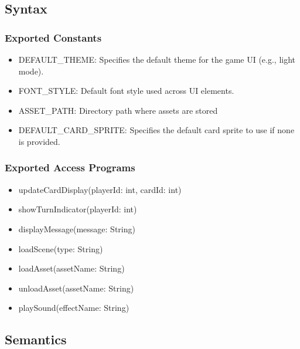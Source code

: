 \documentclass[12pt, titlepage]{article}
\begin{document}
\subsection{Syntax}

\subsubsection{Exported Constants}
\begin{itemize}
\item DEFAULT\_THEME: Specifies the default theme for the game UI (e.g., light mode).
\item FONT\_STYLE: Default font style used across UI elements.
\item ASSET\_PATH: Directory path where assets are stored
\item DEFAULT\_CARD\_SPRITE: Specifies the default card sprite to use if none is provided.

\end{itemize}

\subsubsection{Exported Access Programs}

\begin{itemize}
\item updateCardDisplay(playerId: int, cardId: int)
\item showTurnIndicator(playerId: int)
\item displayMessage(message: String)
\item loadScene(type: String)
\item loadAsset(assetName: String)
\item unloadAsset(assetName: String)
\item playSound(effectName: String)
\end{itemize}

\subsection{Semantics}
\end{document}
